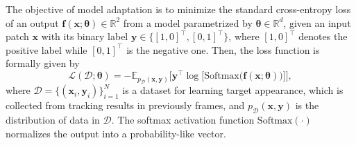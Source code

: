 \documentclass[letterpaper]{article} %
\def \x{\mathbf{x}}
\def \f{\mathbf{f}}
\def \y{\mathbf{y}}
\def \thetageneral{\boldsymbol{\theta}}
\begin{document}

The objective of model adaptation is to minimize the standard cross-entropy loss of an output $\f(\x;\thetageneral)\in\mathbb{R}^2$ from a model parametrized by $\thetageneral\in\mathbb{R}^d$, given an input patch $\x$ with its binary label $\y \in \{[1, 0]^\top, [0, 1]^\top\}$, where $[1, 0]^\top$ denotes the positive label while $[0, 1]^\top$ is the negative one.
Then, the loss function is formally given by
%
\begin{equation}
\mathcal{L}(\mathcal{D};\thetageneral)= -\mathbb{E}_{p_{\mathcal{D}}(\x, \y)} \Big[  \y^\top \log \big[\text{Softmax}\big(\f(\x;\thetageneral)\big)\big] \Big],
\label{eq:adaptation}
\end{equation}
where $\mathcal{D}=\{(\x_i, \y_i)\}_{i=1}^N$ is a dataset for learning target appearance, which is collected from tracking results in previously frames, and $p_{\mathcal{D}}(\x, \y)$ is the distribution of data in $\mathcal{D}$.
The softmax activation function $\text{Softmax}(\cdot)$ normalizes the output into a probability-like vector.
\end{document}
